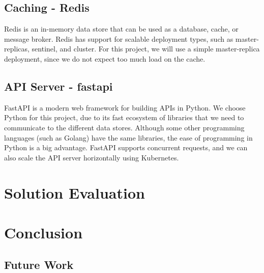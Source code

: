 \documentclass{article}
\begin{document}
    \subsection{Caching - Redis}
    Redis is an in-memory data store that can be used as a database, cache, or message broker.
    Redis has support for scalable deployment types, such as master-replicas, sentinel, and cluster.
    For this project, we will use a simple master-replica deployment, since we do not expect too much load on the cache.

    \subsection{API Server - fastapi}
    FastAPI is a modern web framework for building APIs in Python.
    We choose Python for this project, due to its fast ecosystem of libraries that we need to communicate to the different data stores.
    Although some other programming languages (such as Golang) have the same libraries, the ease of programming in Python is a big advantage.
    FastAPI supports concurrent requests, and we can also scale the API server horizontally using Kubernetes.

    \section{Solution Evaluation}


    \section{Conclusion}

    \subsection{Future Work}
\end{document}
